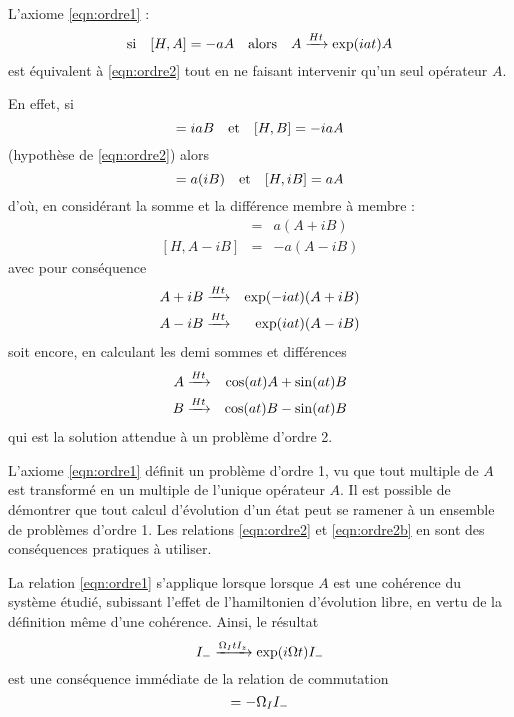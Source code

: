 L'axiome \ref{eqn:ordre1} :
\begin{equation}
\label{eqn:ordre1}
\mbox{si}\quad [H,A]=-aA \quad \mbox{alors} \quad
A \xrightarrow{Ht} \exp(iat)A
\end{equation}
est équivalent à \ref{eqn:ordre2} tout en ne faisant
intervenir qu'un seul opérateur $A$.

En effet, si
\begin{equation}
[H,A] = iaB \qetq [H,B] = -iaA
\end{equation}
(hypothèse de \ref{eqn:ordre2}) alors
\begin{equation}
[H,A] = a(iB) \qetq [H,iB] = aA
\end{equation}
d'où, en considérant la somme et la différence membre à membre :
\begin{eqnarray}
[H,A+iB] & = & a(A+iB) \\
{[H,A-iB]} & = & -a(A-iB)
\end{eqnarray}
avec pour conséquence
\begin{eqnarray}
A+iB & \xrightarrow{Ht} & \exp(-iat)(A+iB) \\
A-iB & \xrightarrow{Ht} & \exp(iat)(A-iB)
\end{eqnarray}
soit encore, en calculant les demi sommes et différences
\begin{eqnarray}
A & \xrightarrow{Ht} & \cos(at)A + \sin(at)B \\
B & \xrightarrow{Ht} & \cos(at)B - \sin(at)B
\end{eqnarray}
qui est la solution attendue à un problème d'ordre 2.

L'axiome \ref{eqn:ordre1} définit un problème d'ordre 1, vu
que tout multiple de $A$ est transformé en un multiple
de l'unique opérateur $A$.
Il est possible de démontrer que tout calcul d'évolution
d'un état peut se ramener à un ensemble de problèmes d'ordre 1.
Les relations \ref{eqn:ordre2} et \ref{eqn:ordre2b} en sont des conséquences
pratiques à utiliser.

La relation \ref{eqn:ordre1} s'applique lorsque
lorsque $A$ est une cohérence du système étudié, subissant
l'effet de l'hamiltonien d'évolution libre, en vertu
de la définition même d'une cohérence.
Ainsi, le résultat
\begin{equation}
I_- \xrightarrow{\Omega_I t I_z} \exp(i\Omega t)I_-
\end{equation}
est une conséquence immédiate de la relation de commutation
\begin{equation}
[\omsi I_z, I_-] = -\omsi I_-
\end{equation}


